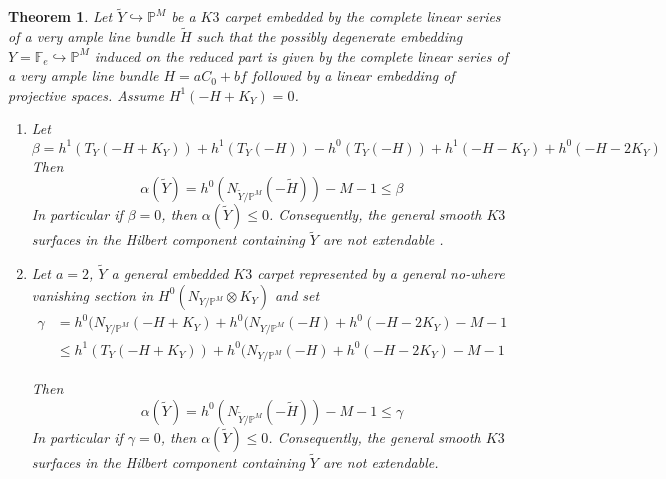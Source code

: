 \documentclass[11pt,twoside]{amsart}
\theoremstyle{plain}
\numberwithin{equation}{section}
\newtheorem{theorem}{Theorem}[section]
\theoremstyle{definition}
\begin{document}




\begin{theorem}\label{ZL for K3 carpets}
 Let $\widetilde{Y} \hookrightarrow \mathbb{P}^M$ be a $K3$ carpet embedded by the complete linear series of a very ample line bundle $\widetilde{H}$ such that the possibly degenerate embedding $Y = \mathbb{F}_e \hookrightarrow \mathbb{P}^M$ induced on the reduced part is given by the complete linear series of a very ample line bundle $H = aC_0+bf$ followed by a linear embedding of projective spaces. Assume $H^1(-H+K_Y) = 0$. 
 
 \begin{enumerate}
 \item Let $$\beta = h^1(T_Y(-H+K_Y)) + h^1(T_Y(-H)) - h^0(T_Y(-H)) +  h^1(-H-K_Y) + h^0(-H-2K_Y)$$ 
Then 
$$\alpha(\widetilde{Y}) = h^0(N_{\widetilde{Y}/\mathbb{P}^M}(-\widetilde{H}))-M-1 \leq  \beta$$ 
In particular if $\beta = 0$, then $\alpha(\widetilde{Y}) \leq 0$. Consequently, the general smooth $K3$ surfaces in the Hilbert component containing $\widetilde{Y}$ are not extendable .

\item Let $a = 2$, $\widetilde{Y}$ a general embedded $K3$ carpet represented by a general no-where vanishing section in $H^0(N_{Y/\mathbb{P}^M} \otimes K_Y)$ and set
\begin{align*}
    \gamma & =  h^0(N_{Y/\mathbb{P}^M}(-H+K_Y)+h^0(N_{Y/\mathbb{P}^M}(-H)+h^0(-H-2K_Y)-M-1 \\
    & \leq h^1(T_Y(-H+K_Y))+h^0(N_{Y/\mathbb{P}^M}(-H)+h^0(-H-2K_Y)-M-1
\end{align*}

Then 
$$\alpha(\widetilde{Y}) = h^0(N_{\widetilde{Y}/\mathbb{P}^M}(-\widetilde{H}))-M-1 \leq  \gamma$$ 
In particular if $\gamma = 0$, then $\alpha(\widetilde{Y}) \leq 0$. Consequently, the general smooth $K3$ surfaces in the Hilbert component containing $\widetilde{Y}$ are not extendable.


\end{enumerate}
\end{theorem}
\end{document}
